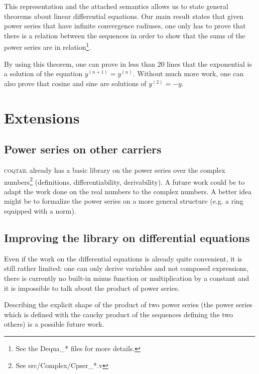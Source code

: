 \documentclass[submission,copyright]{eptcs}
\newcommand{\coqtail}{\textsc{coqtail}}
\begin{document}
This representation and the attached semantics allows us to state general
theorems about linear differential equations. Our main result states that
given power series that have infinite convergence radiuses, one only has
to prove that there is a relation between the sequences in order to show
that the sums of the power series are in relation\footnote{See the
Dequa\_* files for more details.}.


By using this theorem, one can prove in less than 20 lines that the
exponential is a solution of the equation $y^{(n+1)} = y^{(n)}$. Without
much more work, one can also prove that cosine and sine are solutions
of $y^{(2)} = - y$.

\section{Extensions}

\subsection{Power series on other carriers}

\coqtail{} already has a basic library on the power series over the complex
numbers\footnote{See src/Complex/Cpser\_*.v} (definitions, differentiability,
derivability). A future work could be to adapt the work done on the real
numbers to the complex numbers. A better idea might be to formalize the
power series on a more general structure (e.g. a ring equipped with a norm).

\subsection{Improving the library on differential equations}

Even if the work on the differential equations is already quite
convenient, it is still rather limited: one can only derive variables
and not composed expressions, there is currently no built-in minus
function or multiplication by a constant and it is impossible to talk
about the product of power series.

Describing the explicit shape of the product of two power series (the
power series which is defined with the cauchy product of the sequences
defining the two others) is a possible future work.

%
\end{document}
